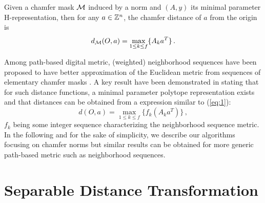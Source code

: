 \documentclass{llncs}
\begin{document}
\begin{proposition}
  Given a chamfer mask $\mathcal{M}$ induced by a  norm and $(A,y)$ its minimal
  parameter H-representation, then for any $a\in{\mathbb{Z}}^n$, the chamfer
  distance of $a$ from the origin is
  \begin{equation}
    \label{eq:1}
    d_{\mathcal{M}}(O,a) =  \max_{1\leq k \leq f} \{ A_k a^T\}\,.
  \end{equation}
\end{proposition}
Among path-based digital metric, (weighted) neighborhood sequences
have been proposed to have better approximation of the Euclidean
metric from sequences of elementary chamfer masks
\cite{Rosenfeld1966,mukherjee,Strand2008,DBLP:conf/dgci/NormandSE13}.
A key result have been demonstrated in
\cite{DBLP:conf/dgci/NormandSE13} stating that for such distance
functions, a minimal parameter polytope representation exists and that
distances can be obtained from a expression similar to (\ref{eq:1}):
\begin{equation}
  d(O,a)  =\max_{1\leq k \leq f} \{ f_k(A_k a^T)\}\,,
\end{equation}
$f_k$ being some integer sequence characterizing the neighborhood
sequence metric. In the following and for the sake of simplicity, we
describe our algorithms focusing on chamfer norms but similar results
can be obtained for more generic path-based metric such as
neighborhood sequences.
\section{Separable Distance Transformation}
\label{sec:separ-dist-transf}
\end{document}

